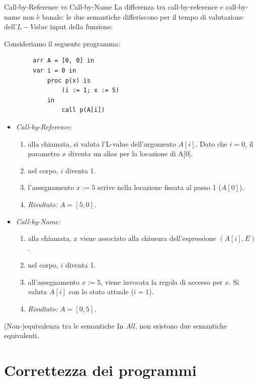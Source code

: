 \documentclass[a4paper,11pt]{report}
\begin{document}
\begin{gframe}{Call-by-Reference vs Call-by-Name}
La differenza tra call-by-reference e call-by-name non è banale: le due semantiche differiscono per il tempo di valutazione dell'\( L-Value \) input della funzione.

Consideriamo il seguente programma:
    \begin{lstlisting}
        arr A = [0, 0] in
        var i = 0 in
            proc p(x) is 
                (i := 1; x := 5) 
            in
                call p(A[i])
    \end{lstlisting}

    \begin{itemize}
        \item \textit{Call-by-Reference}:
        \begin{enumerate}
            \item alla chiamata, si valuta l'L-value dell'argomento $A[i]$. Dato che $i=0$, il parametro $x$ diventa un alias per la locazione di A[0].
            \item nel corpo, $i$ diventa 1.
            \item l'assegnamento $x:=5$ scrive nella locazione fissata al passo 1 ($A[0]$).
        \item \textit{Risultato:} $A = [5, 0]$.
        \end{enumerate}

        \item \textit{Call-by-Name:}
        \begin{enumerate}
            \item alla chiamata, $x$ viene associato alla chiusura dell'espressione $(A[i], E)$.
            \item nel corpo, $i$ diventa 1.
            \item all'assegnamento $x:=5$, viene invocata la regola di accesso per $x$. Si valuta $A[i]$ con lo stato attuale ($i=1$).
        \item \textit{Risultato:} $A = [0, 5]$.
        \end{enumerate}
    \end{itemize}
\end{gframe}

\begin{lemmaframe}{(Non-)equivalenza tra le semantiche}{}
    In \( All \), non esistono due semantiche equivalenti.
\end{lemmaframe}

\chapter{Correttezza dei programmi}
\end{document}
